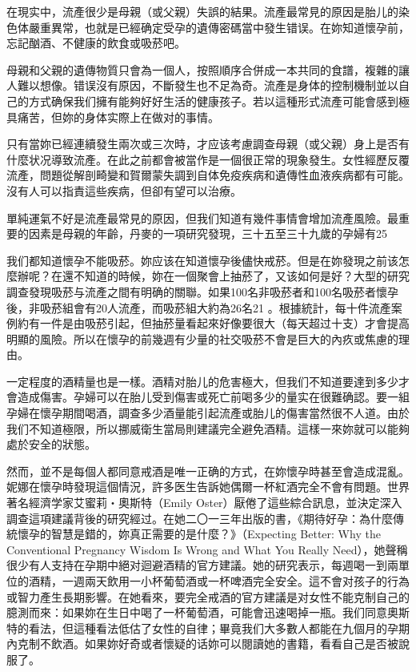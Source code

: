 \documentclass[12pt,UTF8]{ctexbook}
\begin{document}
在現实中，流產很少是母親（或父親）失誤的結果。流產最常見的原因是胎儿的染色体嚴重異常，也就是已經确定受孕的遺傳密碼當中發生错误。在妳知道懷孕前，忘記酗酒、不健康的飲食或吸菸吧。

母親和父親的遺傳物質只會為一個人，按照順序合併成一本共同的食譜，複雜的讓人難以想像。错误沒有原因，不斷發生也不足為奇。流產是身体的控制機制並以自己的方式确保我们擁有能夠好好生活的健康孩子。若以這種形式流產可能會感到極具痛苦，但妳的身体实際上在做对的事情。

只有當妳已經連續發生兩次或三次時，才应该考慮調查母親（或父親）身上是否有什麼状况導致流產。在此之前都會被當作是一個很正常的現象發生。女性經歷反覆流產，問題從解剖畸變和賀爾蒙失調到自体免疫疾病和遺傳性血液疾病都有可能。沒有人可以指責這些疾病，但卻有望可以治療。

單純運氣不好是流產最常見的原因，但我们知道有幾件事情會增加流產風險。最重要的因素是母親的年齡，丹麥的一項研究發現，三十五至三十九歲的孕婦有25%

我们都知道懷孕不能吸菸。妳应该在知道懷孕後儘快戒菸。但是在妳發現之前该怎麼辦呢？在還不知道的時候，妳在一個聚會上抽菸了，又该如何是好？大型的研究調查發現吸菸与流產之間有明确的關聯。如果100名非吸菸者和100名吸菸者懷孕後，非吸菸組會有20人流產，而吸菸組大約為26名21 。根據統計，每十件流產案例約有一件是由吸菸引起，但抽菸量看起來好像要很大（每天超过十支）才會提高明顯的風險。所以在懷孕的前幾週有少量的社交吸菸不會是巨大的內疚或焦慮的理由。

一定程度的酒精量也是一樣。酒精对胎儿的危害極大，但我们不知道要達到多少才會造成傷害。孕婦可以在胎儿受到傷害或死亡前喝多少的量实在很難确認。要一組孕婦在懷孕期間喝酒，調查多少酒量能引起流產或胎儿的傷害當然很不人道。由於我们不知道極限，所以挪威衛生當局則建議完全避免酒精。這樣一來妳就可以能夠處於安全的狀態。

然而，並不是每個人都同意戒酒是唯一正确的方式，在妳懷孕時甚至會造成混亂。妮娜在懷孕時發現這個情況，許多医生告訴她偶爾一杯紅酒完全不會有問題。世界著名經濟学家艾蜜莉‧奧斯特（Emily Oster）厭倦了這些綜合訊息，並決定深入調查這項建議背後的研究經过。在她二〇一三年出版的書，《期待好孕：為什麼傳統懷孕的智慧是錯的，妳真正需要的是什麼？》（Expecting Better: Why the Conventional Pregnancy Wisdom Is Wrong and What You Really Need），她聲稱很少有人支持在孕期中絕对迴避酒精的官方建議。她的研究表示，每週喝一到兩單位的酒精，一週兩天飲用一小杯葡萄酒或一杯啤酒完全安全。這不會对孩子的行為或智力產生長期影響。在她看來，要完全戒酒的官方建議是对女性不能克制自己的臆測而來：如果妳在生日中喝了一杯葡萄酒，可能會迅速喝掉一瓶。我们同意奧斯特的看法，但這種看法低估了女性的自律；畢竟我们大多數人都能在九個月的孕期內克制不飲酒。如果妳好奇或者懷疑的话妳可以閱讀她的書籍，看看自己是否被說服了。
\end{document}
